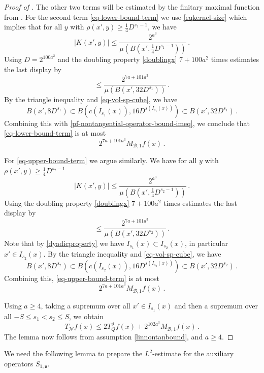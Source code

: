 \documentclass[10pt,a4paper]{article}
\theoremstyle{plain}
\theoremstyle{definition}
\numberwithin{equation}{subsection}
\newcommand{\fu}{{\mathfrak u}}
\newcommand{\tQ}{{Q}}
\newcommand{\mfa}{{\vartheta}}
\begin{document}
\begin{proof}[Proof of ]
    The other two terms will be estimated by the finitary maximal function from .
    For the second term \eqref{eq-lower-bound-term} we use \eqref{eqkernel-size} which implies that for all $y$ with $\rho(x', y) \ge \frac{1}{4}D^{s_1 - 1}$, we have
    $$
        |K(x', y)| \le \frac{2^{a^3}}{\mu(B(x', \frac{1}{4}D^{s_1 - 1}))}\,.
    $$
    Using $D=2^{100a^2}$
    and the doubling property \eqref{doublingx} $7 +100a^2$ times estimates
    the last display by
    \begin{equation}
    \label{pf-nontangential-operator-bound-imeq}
        \le \frac{2^{7a+101a^3}}{\mu(B(x', 32D^{s_1}))}\, .
    \end{equation}
    By the triangle inequality and \eqref{eq-vol-sp-cube}, we have
    $$
        B(x', 8D^{s_1}) \subset B(c(I_{s_1}(x)), 16D^{s(I_{s_1}(x))}) \subset B(x', 32D^{s_1})\,.
    $$
    Combining this with \eqref{pf-nontangential-operator-bound-imeq}, we conclude that \eqref{eq-lower-bound-term} is at most
    $$
        2^{7a + 101a^3} M_{\mathcal{B},1} f(x)\,.
    $$

    For \eqref{eq-upper-bound-term} we argue similarly. We have for all $y$ with $\rho(x', y) \ge \frac{1}{4}D^{s_2-1}$
    $$
        |K(x', y)| \le \frac{2^{a^3}}{\mu(B(x', \frac{1}{4}D^{s_2-1}))}\,.
    $$
    Using the doubling property \eqref{doublingx} $7 + 100a^2$ times estimates
    the last display by
    \begin{equation}
        \le \frac{2^{7a + 101a^3}}{\mu(B(x', 32 D^{s_2}))}\, .
    \end{equation}
    Note that by \eqref{dyadicproperty} we have $I_{s_1}(x) \subset I_{s_2}(x)$, in particular $x' \in I_{s_2}(x)$.
    By the triangle inequality and \eqref{eq-vol-sp-cube}, we have
    $$
        B(x', 8D^{s_2}) \subset B(c(I_{s_2}(x)), 16D^{s(I_{s_2}(x))}) \subset B(x', 32D^{s_2})\,.
    $$
    Combining this, \eqref{eq-upper-bound-term} is at most
    $$
        2^{7a+101a^3} M_{\mathcal{B},1} f(x)\,.
    $$

    Using $a \ge 4$, taking a supremum over all $x' \in I_{s_1}(x)$ and then a supremum over all $-S \le s_1 < s_2 \le S$, we obtain
    $$
        T_{\mathcal{N}} f(x) \le 2T_{\tQ}^\mfa f(x) + 2^{102a^3} M_{\mathcal{B},1} f(x)\,.
    $$
    The lemma now follows from assumption \eqref{linnontanbound},  and $a \ge 4$.
\end{proof}

We need the following lemma to prepare the $L^2$-estimate for the auxiliary operators $S_{1, \fu}$.
\end{document}
